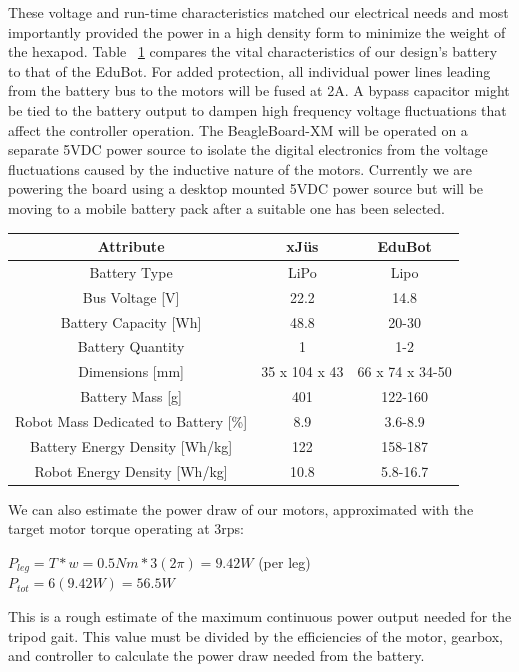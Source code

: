 \documentclass[11pt]{article}
\begin{document}
These voltage and run-time characteristics matched our electrical needs and most importantly provided the power in a high density form to minimize the weight of the hexapod. Table ~\ref{table:battery} compares the vital characteristics of our design's battery to that of the EduBot. For added protection, all individual power lines leading from the battery bus to the motors will be fused at 2A. A bypass capacitor might be tied to the battery output to dampen high frequency voltage fluctuations that affect the controller operation. The BeagleBoard-XM will be operated on a separate 5VDC power source to isolate the digital electronics from the voltage fluctuations caused by the inductive nature of the motors. Currently we are powering the board using a desktop mounted 5VDC power source but will be moving to a mobile battery pack after a suitable one has been selected.

\begin{table}[ht]
\centering
\begin{tabular}{ccc}
\hline
\textbf{Attribute} & \textbf{xJ\"{u}s} & \textbf{EduBot} \\
\hline
Battery Type & LiPo & Lipo \\
Bus Voltage [V] & 22.2 & 14.8 \\
Battery Capacity [Wh] & 48.8 & 20-30 \\
Battery Quantity & 1 & 1-2 \\
Dimensions [mm] & 35 x 104 x 43 & 66 x 74 x 34-50 \\
Battery Mass [g] & 401 & 122-160 \\
Robot Mass Dedicated to Battery [\%] & 8.9 & 3.6-8.9 \\
Battery Energy Density [Wh/kg] & 122 & 158-187 \\
Robot Energy Density [Wh/kg] & 10.8 & 5.8-16.7 \\
\hline
\end{tabular}
\label{table:battery}
\end{table}

We can also estimate the power draw of our motors, approximated with the target motor torque operating at 3rps:
 \begin{center}
$P_{leg} = T*w = 0.5Nm*3(2\pi) = 9.42 W$ (per leg) \\
$P_{tot} = 6(9.42W) = 56.5W$
\end{center}

This is a rough estimate of the maximum continuous power output needed for the tripod gait. This value must be divided by the efficiencies of the motor, gearbox, and controller to calculate the power draw needed from the battery.
\end{document}
